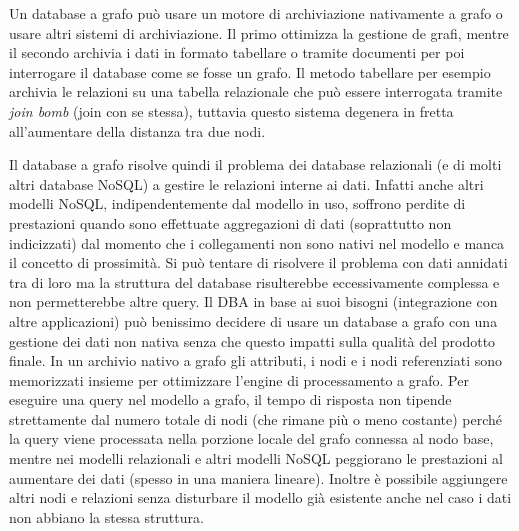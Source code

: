 \documentclass[a4page, 11pt]{article}
\begin{document}
Un database a grafo può usare un motore di archiviazione nativamente a grafo o usare altri sistemi di archiviazione. Il primo ottimizza la gestione de grafi, mentre il secondo archivia i dati in formato tabellare o tramite documenti per poi interrogare il database come se fosse un grafo.
Il metodo tabellare per esempio archivia le relazioni su una tabella relazionale che può essere interrogata tramite \textit{join bomb} (join con se stessa), tuttavia questo sistema degenera in fretta all'aumentare della distanza tra due nodi.

Il database a grafo risolve quindi il problema dei database relazionali (e di molti altri database NoSQL) a gestire le relazioni interne ai dati.
Infatti anche altri modelli NoSQL, indipendentemente dal modello in uso, soffrono perdite di prestazioni quando sono effettuate aggregazioni di dati (soprattutto non indicizzati) dal momento che i collegamenti non sono nativi nel modello e manca il concetto di prossimità.
Si può tentare di risolvere il problema con dati annidati tra di loro ma la struttura del database risulterebbe eccessivamente complessa e non permetterebbe altre query.
Il DBA in base ai suoi bisogni (integrazione con altre applicazioni) può benissimo decidere di usare un database a grafo con una gestione dei dati non nativa senza che questo impatti sulla qualità del prodotto finale.
In un archivio nativo a grafo gli attributi, i nodi e i nodi referenziati sono memorizzati insieme per ottimizzare l'engine di processamento a grafo.
Per eseguire una query nel modello a grafo, il tempo di risposta non tipende strettamente dal numero totale di nodi (che rimane più o meno costante) perché la query viene processata nella porzione locale del grafo connessa al nodo base, mentre nei modelli relazionali e altri modelli NoSQL peggiorano le prestazioni al aumentare dei dati (spesso in una maniera lineare).
Inoltre è possibile aggiungere altri nodi e relazioni senza disturbare il modello già esistente anche nel caso i dati non abbiano la stessa struttura.
\end{document}
